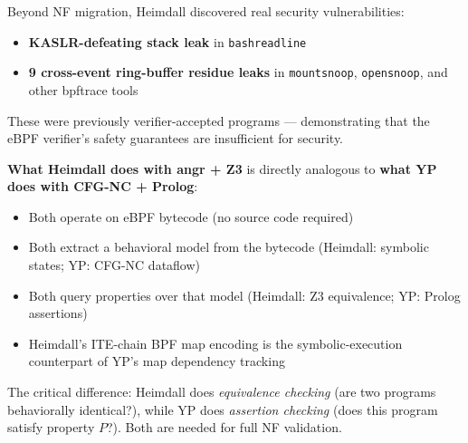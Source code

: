 \documentclass[12pt, a4paper]{article}
\begin{document}
Beyond NF migration, Heimdall discovered real security vulnerabilities:
\begin{itemize}
  \item \textbf{KASLR-defeating stack leak} in \texttt{bashreadline}
  \item \textbf{9 cross-event ring-buffer residue leaks} in \texttt{mountsnoop}, \texttt{opensnoop}, and other bpftrace tools
\end{itemize}
These were previously verifier-accepted programs --- demonstrating that the eBPF verifier's safety guarantees are insufficient for security.

\begin{analogybox}
\textbf{What Heimdall does with angr + Z3} is directly analogous to \textbf{what YP does with CFG-NC + Prolog}:
\begin{itemize}
  \item Both operate on eBPF bytecode (no source code required)
  \item Both extract a behavioral model from the bytecode (Heimdall: symbolic states; YP: CFG-NC dataflow)
  \item Both query properties over that model (Heimdall: Z3 equivalence; YP: Prolog assertions)
  \item Heimdall's ITE-chain BPF map encoding is the symbolic-execution counterpart of YP's map dependency tracking
\end{itemize}
The critical difference: Heimdall does \emph{equivalence checking} (are two programs behaviorally identical?), while YP does \emph{assertion checking} (does this program satisfy property $P$?). Both are needed for full NF validation.
\end{analogybox}
\end{document}

